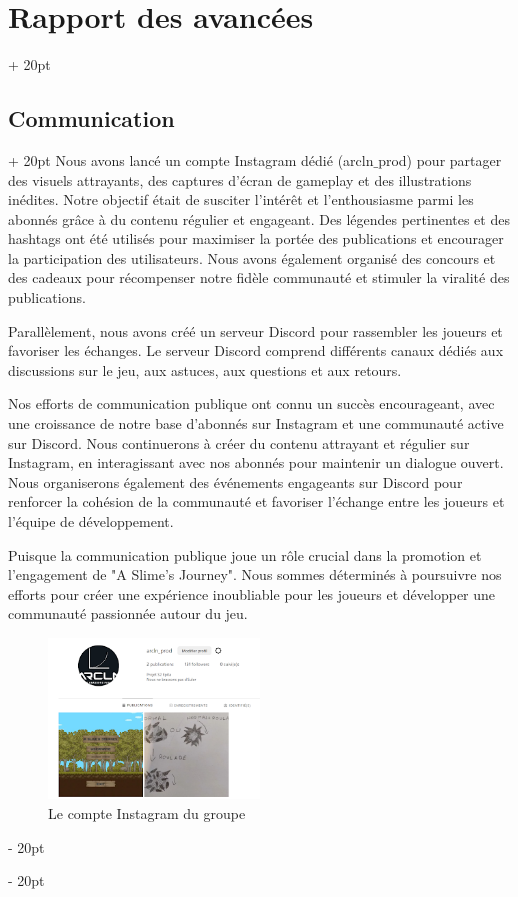 \documentclass[a4paper, 12pt, twoside]{article}
\newcommand{\ind}[1][20pt]{\advance\leftskip + #1}
\newcommand{\deind}[1][20pt]{\advance\leftskip - #1}
\newenvironment{indt}[2][20pt]{#2 \par \ind[#1]}{\par \deind} %
\begin{document}
\begin{indt}{\section{Rapport des avancées}}
\begin{indt}{\subsection{Communication}}
            Nous avons lancé un compte Instagram dédié (arcln$\_$prod) pour partager des visuels attrayants, des captures d'écran de gameplay et des illustrations inédites. Notre objectif était de susciter l'intérêt et l'enthousiasme parmi les abonnés grâce à du contenu régulier et engageant. Des légendes pertinentes et des hashtags ont été utilisés pour maximiser la portée des publications et encourager la participation des utilisateurs. Nous avons également organisé des concours et des cadeaux pour récompenser notre fidèle communauté et stimuler la viralité des publications.

            Parallèlement, nous avons créé un serveur Discord pour rassembler les joueurs et favoriser les échanges. Le serveur Discord comprend différents canaux dédiés aux discussions sur le jeu, aux astuces, aux questions et aux retours.

            Nos efforts de communication publique ont connu un succès encourageant, avec une croissance de notre base d'abonnés sur Instagram et une communauté active sur Discord. Nous continuerons à créer du contenu attrayant et régulier sur Instagram, en interagissant avec nos abonnés pour maintenir un dialogue ouvert. Nous organiserons également des événements engageants sur Discord pour renforcer la cohésion de la communauté et favoriser l'échange entre les joueurs et l'équipe de développement.

            Puisque la communication publique joue un rôle crucial dans la promotion et l'engagement de "A Slime's Journey". Nous sommes déterminés à poursuivre nos efforts pour créer une expérience inoubliable pour les joueurs et développer une communauté passionnée autour du jeu.

            \begin{figure}[h]
                \centering
                \includegraphics[width=0.5\textwidth]{Insta.png}
                \caption{Le compte Instagram du groupe}
                \label{fig:mesh1}
            \end{figure}
        \end{indt}


\end{indt}
\end{document}
